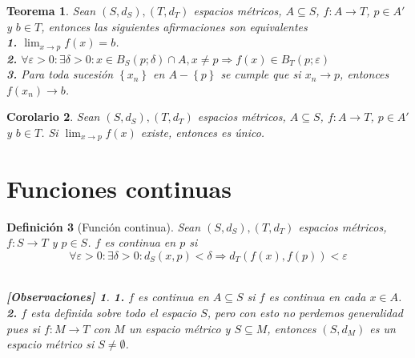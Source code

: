 \documentclass[oneside]{book} %
\theoremstyle{Teorema}
\newtheorem{Definicion}{Definición}[chapter]
\newtheorem{Teorema}[Definicion]{Teorema}
\newtheorem{Corolario}[Definicion]{Corolario}
\theoremstyle{Ejemplos}
\theoremstyle{[Obs]}
\newtheorem*{Obs}{[Observaciones]}
\renewcommand{\{}{\left\lbrace} %
\renewcommand{\}}{\right\rbrace} %
\newcommand{\n}{\cap} %
\renewcommand{\sc}{\subseteq} %
\begin{document}
			\begin{Teorema}
				
				Sean $(S, d_S), (T, d_T)$ espacios métricos, $A \sc S$, $f : A \to T$, $p \in A'$ y $b \in T$, entonces las siguientes afirmaciones son equivalentes \\

				\textbf{1.} $\displaystyle\lim_{x \to p} f(x) = b$. \\

				\textbf{2.} $\forall \varepsilon > 0 : \exists \delta > 0 : x \in B_S(p;\delta) \n A, x \neq p \Rightarrow f(x) \in B_T(p;\varepsilon)$ \\

				\textbf{3.} Para toda sucesión $\{ x_n \}$ en $A - \{ p \}$ se cumple que si $x_n \to p$, entonces $f(x_n) \to b$. \\

			\end{Teorema}

			\begin{Corolario}
				
				Sean $(S, d_S), (T, d_T)$ espacios métricos, $A \sc S$, $f : A \to T$, $p \in A'$ y $b \in T$. Si $\displaystyle\lim_{x \to p} f(x)$ existe, entonces es único. \\

			\end{Corolario}

		\section{Funciones continuas}

			\begin{Definicion}[Función continua]
				
				Sean $(S, d_S), (T, d_T)$ espacios métricos, $f : S \to T$ y $p \in S$. $f$ es continua en $p$ si \\

				\[ \forall \varepsilon > 0 : \exists \delta > 0 : d_S(x, p) < \delta \Rightarrow d_T(f(x), f(p)) < \varepsilon \] \\

				\begin{Obs}
				
					\hfill
				
					\textbf{1.} $f$ es continua en $A \sc S$ si $f$ es continua en cada $x \in A$. \\

					\textbf{2.} $f$ esta definida sobre todo el espacio $S$, pero con esto no perdemos generalidad pues si $f : M \to T$ con $M$ un espacio métrico y $S \sc M$, entonces $(S, d_M)$ es un espacio métrico si $S \neq \emptyset$. \\
				
				\end{Obs}

			\end{Definicion}
\end{document}
